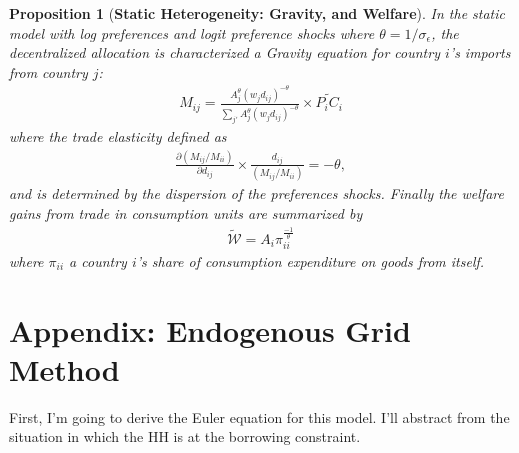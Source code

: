 \documentclass[12pt,pdftex]{article}
\newtheorem{prp}{Proposition}
\begin{document}
\begin{onehalfspacing}
\begin{prp}[\textbf{Static Heterogeneity: Gravity, and Welfare}] \label{apx-prp:static} In the static model with log preferences and logit preference shocks where $\theta = 1 / \sigma_{\epsilon}$, the decentralized allocation is characterized a Gravity equation for country $i$'s imports from country $j$:
{\small
\begin{align}
M_{ij} =  \frac{A_j^{\theta}(w_jd_{ij})^{-\theta}}{\sum_{j'} A_j^{\theta}(w_jd_{ij})^{-\theta}} \times \widetilde{P_{i} C_{i}}
\label{appendix-eq:static-gravity}
\end{align}
}
where the trade elasticity defined as
\begin{align}
\frac{\partial ( M_{ij} / M_{ii} )}{\partial d_{ij}} \times \frac{d_{ij}}{( M_{ij} / M_{ii} )} = -\theta,
\end{align}
and is determined by the dispersion of the preferences shocks. Finally the welfare gains from trade in consumption units are summarized by
\begin{align}
\mathcal{\tilde W} = A_{i} \pi_{ii}^{\frac{-1}{\theta}}
\end{align}
where $\pi_{ii}$ a country $i$'s share of consumption expenditure on goods from itself.
\end{prp}


\section{Appendix: Endogenous Grid Method}

First, I'm going to derive the Euler equation for this model. I'll abstract from the situation in which the HH is at the borrowing constraint.


\end{onehalfspacing}
\end{document}
